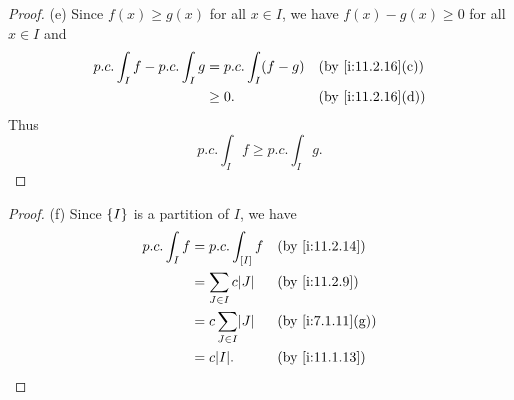 \begin{proof}{(e)}
  Since \(f(x) \geq g(x)\) for all \(x \in I\), we have \(f(x) - g(x) \geq 0\) for all \(x \in I\) and
  \begin{align*}
    p.c. \int_I f - p.c. \int_I g & = p.c. \int_I (f - g) &  & \by{i:11.2.16}[c] \\
                                  & \geq 0.               &  & \by{i:11.2.16}[d]
  \end{align*}
  Thus
  \[
    p.c. \int_I f \geq p.c. \int_I g.
  \]
\end{proof}

\begin{proof}{(f)}
  Since \(\left\lbrace I\right\rbrace\) is a partition of \(I\), we have
  \begin{align*}
    p.c. \int_I f & = p.c. \int_{[I]} f        &  & \by{i:11.2.14}   \\
                  & = \sum_{J \in I} c \abs{J} &  & \by{i:11.2.9}    \\
                  & = c \sum_{J \in I} \abs{J} &  & \by{i:7.1.11}[g] \\
                  & = c \abs{I}.               &  & \by{i:11.1.13}
  \end{align*}
\end{proof}

